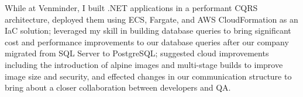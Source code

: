 While at Venminder, I built .NET applications in a performant CQRS architecture, deployed them using ECS, Fargate, and AWS CloudFormation as an IaC solution; leveraged my skill in building database queries to bring significant cost and performance improvements to our database queries after our company migrated from SQL Server to PostgreSQL; suggested cloud improvements including the introduction of alpine images and multi-stage builds to improve image size and security, and effected changes in our communication structure to bring about a closer collaboration between developers and QA.
